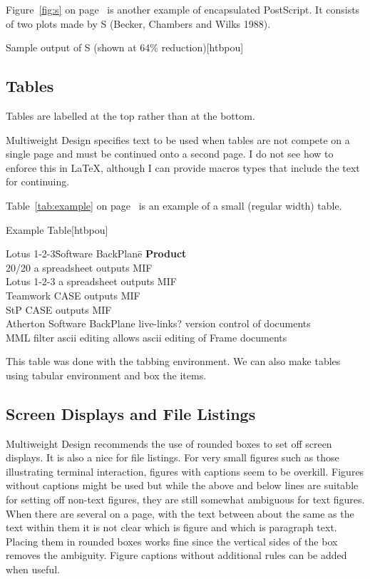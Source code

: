 Figure~\ref{fig:s} on page~\pageref{fig:s} is another example of encapsulated
PostScript.  It consists of two plots made by S (Becker, Chambers and
Wilks 1988).
\begin{capfigure}{\label{fig:s}Sample output of S (shown at 64\%
  reduction)}[htbpou] 
\end{capfigure}


\subsection{Tables}
Tables are labelled at the top rather than at the bottom. 

Multiweight Design specifies text to be used when tables are not compete on a 
single page and must be continued onto a second page. I do not see how to 
enforce this in \LaTeX, although I can provide macros types
that include the text for continuing.


Table~\ref{tab:example} on page~\pageref{tab:example} is an example of
a small (regular width) table.

\begin{captable}{\label{tab:example}Example Table}[htbpou]
\begin{tabbing}
Lotus 1-2-3\quad\=Software BackPlane\quad\=\kill
{\bf Product}\\
20/20\>	a spreadsheet\>	outputs MIF\\
Lotus 1-2-3\>	a spreadsheet\>	outputs MIF\\
Teamwork\>	CASE\>	outputs MIF\\
StP\>	CASE\>	outputs MIF\\
Atherton\>	Software BackPlane\>	live-links? version control of documents\\
MML filter\>	ascii editing\>	allows ascii editing of Frame documents\\
\end{tabbing}
\end{captable}

This table was done with the tabbing environment.  We can also make
tables using tabular environment and box the items.

\subsection{Screen Displays and File Listings}
Multiweight Design recommends the use of rounded boxes to set off
screen displays.  It is also a nice for file listings.  For very small
figures such as those illustrating terminal interaction, figures with
captions seem to be overkill.  Figures without captions might be used
but while the above and
below lines are suitable for setting off non-text figures, they
are still somewhat ambiguous for text figures.  When
there are several on a page, with the text between about the same as
the text within them it is not clear which is figure and which is
paragraph text.  Placing them in rounded boxes works fine since the
vertical sides of the box removes the ambiguity.  Figure captions
without additional rules can be added when useful.

